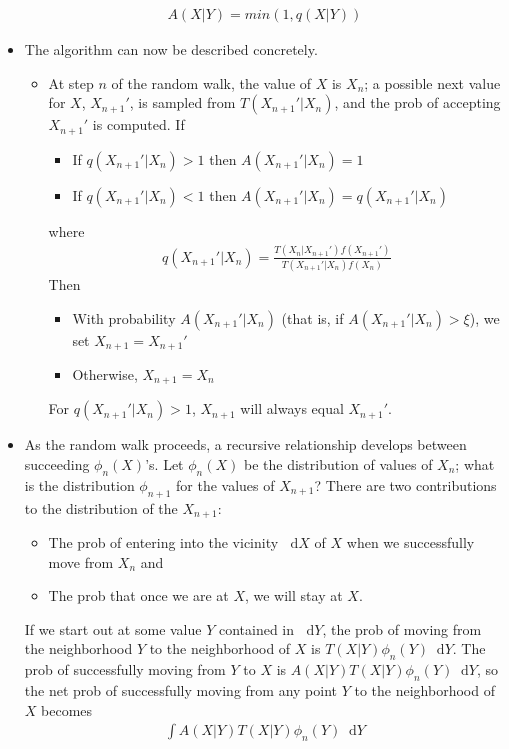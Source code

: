 \documentclass[twoside,english]{uiofysmaster}
\newcommand*\dif{\mathop{}\!\mathrm{d}}
\begin{document}
\begin{itemize}
\begin{align}
		A(X|Y) = min(1, q(X|Y))
	\end{align}
	\item The algorithm can now be described concretely.
	\begin{itemize}
		\item At step $n$ of the random walk, the value of $X$ is $X_n$; a possible next value for $X$, $X_{n+1}'$, is sampled from $T(X_{n+1}'|X_n)$, and the prob of accepting $X_{n+1}'$ is computed. If
		\begin{itemize}
			\item If $q(X_{n+1}'|X_n) >1$ then $A(X_{n+1}'|X_n) =1$
			\item If $q(X_{n+1}'|X_n) <1$ then $A(X_{n+1}'|X_n) = q(X_{n+1}'|X_n)$
		\end{itemize}
		where
		\begin{align}
			q(X_{n+1}'|X_n) = \frac{T(X_n|X_{n+1}') f(X_{n+1}')}{T(X_{n+1}'|X_n) f(X_n)}
		\end{align}
		Then
		\begin{itemize} 
			\item With probability $A(X_{n+1}'|X_n)$ (that is, if $A(X_{n+1}'|X_n) > \xi$), we set $X_{n+1} = X_{n+1}'$
			\item Otherwise, $X_{n+1} = X_n$
		\end{itemize}
		For $q(X_{n+1}'|X_n) > 1$, $X_{n+1}$ will always equal $X_{n+1}'$.
	\end{itemize}
	\item As the random walk proceeds, a recursive relationship develops between succeeding $\phi_n (X)$'s. Let $\phi_n (X)$ be the distribution of values of $X_n$; what is the distribution $\phi_{n+1}$ for the values of $X_{n+1}$? There are two contributions to the distribution of the $X_{n+1}$:
	\begin{itemize}
		\item The prob of entering into the vicinity $\dif X$ of $X$ when we successfully move from $X_n$ and
		\item The prob that once we are at $X$, we will stay at $X$. 
	\end{itemize}
	If we start out at some value $Y$ contained in $\dif Y$, the prob of moving from the neighborhood $Y$ to the neighborhood of $X$ is $T(X|Y)\phi_n(Y) \dif Y$. The prob of successfully moving from $Y$ to $X$ is $A(X|Y)T(X|Y)\phi_n(Y) \dif Y$, so the net prob of successfully moving from any point $Y$ to the neighborhood of $X$ becomes
	\begin{align}
		\int A(X|Y) T(X|Y) \phi_n (Y) \dif Y
	\end{align}

\end{itemize}
\end{document}
